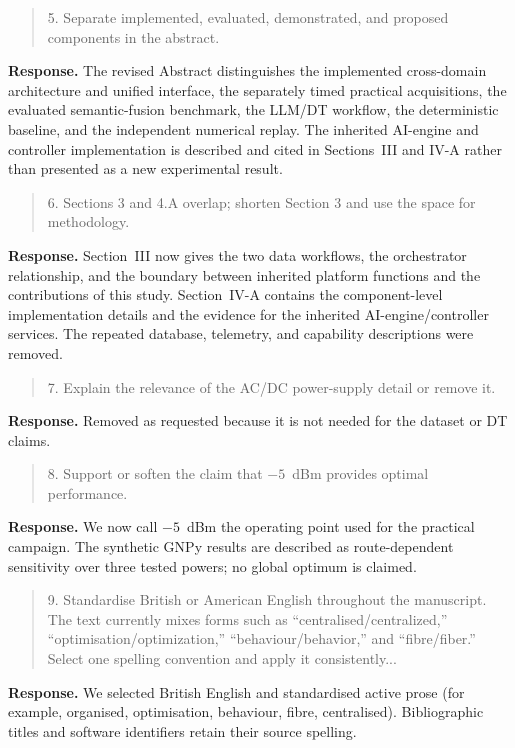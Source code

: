\documentclass[11pt]{article}
\newenvironment{reviewercomment}{\begin{quote}\color{reviewblue}}{\end{quote}}
\newenvironment{authorresponse}{\color{responsegreen}\textbf{Response.} }{\par\color{black}}
\begin{document}
\begin{reviewercomment}
5. Separate implemented, evaluated, demonstrated, and proposed components in the abstract.
\end{reviewercomment}
\begin{authorresponse}
The revised Abstract distinguishes the implemented cross-domain architecture and unified interface, the separately timed practical acquisitions, the evaluated semantic-fusion benchmark, the LLM/DT workflow, the deterministic baseline, and the independent numerical replay. The inherited AI-engine and controller implementation is described and cited in Sections~III and IV-A rather than presented as a new experimental result.
\end{authorresponse}

\begin{reviewercomment}
6. Sections 3 and 4.A overlap; shorten Section 3 and use the space for methodology.
\end{reviewercomment}
\begin{authorresponse}
Section~III now gives the two data workflows, the orchestrator relationship, and the boundary between inherited platform functions and the contributions of this study. Section~IV-A contains the component-level implementation details and the evidence for the inherited AI-engine/controller services. The repeated database, telemetry, and capability descriptions were removed.
\end{authorresponse}

\begin{reviewercomment}
7. Explain the relevance of the AC/DC power-supply detail or remove it.
\end{reviewercomment}
\begin{authorresponse}
Removed as requested because it is not needed for the dataset or DT claims.
\end{authorresponse}

\begin{reviewercomment}
8. Support or soften the claim that $-5$~dBm provides optimal performance.
\end{reviewercomment}
\begin{authorresponse}
We now call $-5$~dBm the operating point used for the practical campaign. The synthetic GNPy results are described as route-dependent sensitivity over three tested powers; no global optimum is claimed.
\end{authorresponse}

\begin{reviewercomment}
9. Standardise British or American English throughout the manuscript. The text currently mixes forms such as ``centralised/centralized,'' ``optimisation/optimization,'' ``behaviour/behavior,'' and ``fibre/fiber.'' Select one spelling convention and apply it consistently...
\end{reviewercomment}
\begin{authorresponse}
We selected British English and standardised active prose (for example, organised, optimisation, behaviour, fibre, centralised). Bibliographic titles and software identifiers retain their source spelling.
\end{authorresponse}
\end{document}
